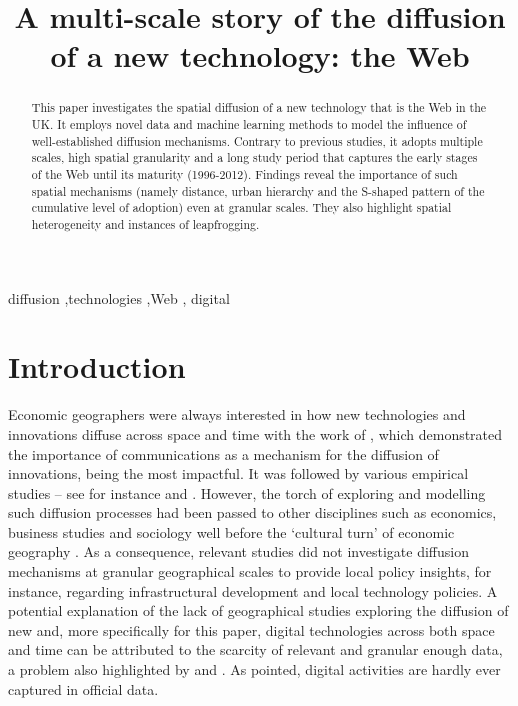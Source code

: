 \documentclass[
  authoryear,
  preprint,
  3p]{elsarticle}
\begin{document}
\begin{frontmatter}
\title{A multi-scale story of the diffusion of a new technology: the
Web}


        
\begin{abstract}
This paper investigates the spatial diffusion of a new technology that
is the Web in the UK. It employs novel data and machine learning methods
to model the influence of well-established diffusion mechanisms.
Contrary to previous studies, it adopts multiple scales, high spatial
granularity and a long study period that captures the early stages of
the Web until its maturity (1996-2012). Findings reveal the importance
of such spatial mechanisms (namely distance, urban hierarchy and the
S-shaped pattern of the cumulative level of adoption) even at granular
scales. They also highlight spatial heterogeneity and instances of
leapfrogging.
\end{abstract}





\begin{keyword}
    diffusion \sep technologies \sep Web \sep 
    digital
\end{keyword}
\end{frontmatter}
    

\section{Introduction}\label{sec-introduction}

Economic geographers were always interested in how new technologies and
innovations diffuse across space and time with the work of
\citet{hagerstrand1968innovation}, which demonstrated the importance of
communications as a mechanism for the diffusion of innovations, being
the most impactful. It was followed by various empirical studies -- see
for instance \citet{ormrod1990} and \citet{iso2005}. However, the torch
of exploring and modelling such diffusion processes had been passed to
other disciplines such as economics, business studies and sociology well
before the `cultural turn' of economic geography
\citep{perkins2005international, ding2010modeling}. As a consequence,
relevant studies did not investigate diffusion mechanisms at granular
geographical scales to provide local policy insights, for instance,
regarding infrastructural development and local technology policies. A
potential explanation of the lack of geographical studies exploring the
diffusion of new and, more specifically for this paper, digital
technologies across both space and time can be attributed to the
scarcity of relevant and granular enough data, a problem also
highlighted by \citet{iso2005} and \citet{kemeny2011international}. As
\citet{zook2022mapping} pointed, digital activities are hardly ever
captured in official data.
\end{document}
